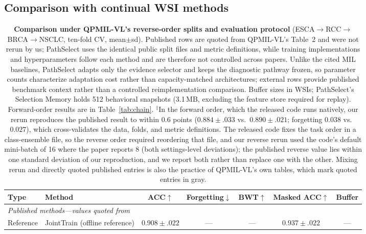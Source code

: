 \documentclass{article}
\begin{document}
\subsection{Comparison with continual WSI methods}
\label{ssec:sota}

\begin{table}[t]
\centering\footnotesize
\caption{\textbf{Comparison under QPMIL-VL's reverse-order splits and evaluation protocol} (ESCA$\rightarrow$RCC$\rightarrow$BRCA$\rightarrow$NSCLC, ten-fold CV, mean$\pm$sd). Published rows are quoted from QPMIL-VL's Table~2 \cite{gou2025qpmil} and were not rerun by us; PathSelect uses the identical public split files and metric definitions, while training implementations and hyperparameters follow each method and are therefore not controlled across papers. Unlike the cited MIL baselines, PathSelect adapts only the evidence selector and keeps the diagnostic pathway frozen, so parameter counts characterize adaptation cost rather than capacity-matched architectures; external rows provide published benchmark context rather than a controlled reimplementation comparison. Buffer sizes in WSIs; PathSelect's Selection Memory holds 512 behavioral snapshots (3.1\,MB, excluding the feature store required for replay). Forward-order results are in Table~\ref{tab:chain}. $^\ddagger$In the forward order, which the released code runs natively, our rerun reproduces the published result to within $0.6$ points ($0.884{\pm}.033$ vs.\ $0.890{\pm}.021$; forgetting $0.038$ vs.\ $0.027$), which cross-validates the data, folds, and metric definitions. The released code fixes the task order in a class-ensemble file, so the reverse order required reordering that file, and our reverse rerun used the code's default mini-batch of 16 where the paper reports 8 (both settings-level deviations); the published reverse value lies within one standard deviation of our reproduction, and we report both rather than replace one with the other. Mixing rerun and directly quoted published entries is also the practice of QPMIL-VL's own tables, which mark quoted entries in gray.}
\label{tab:sota}
\begin{tabular}{llccccc}
\toprule
Type & Method & ACC$\uparrow$ & Forgetting$\downarrow$ & BWT$\uparrow$ & Masked ACC$\uparrow$ & Buffer \\
\midrule
\multicolumn{7}{l}{\emph{Published methods---values quoted from \cite{gou2025qpmil}}} \\
Reference & JointTrain (offline reference) & $0.908{\pm}.022$ & --- & --- & $0.937{\pm}.022$ & --- \\

\end{tabular}
\end{table}
\end{document}
